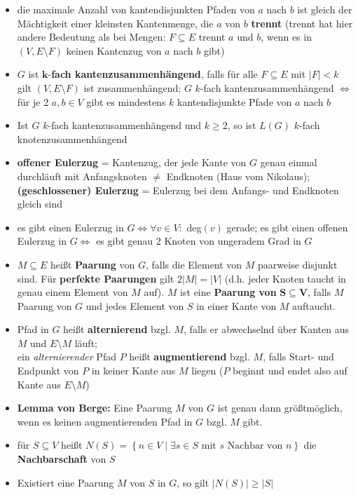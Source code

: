 \documentclass[10pt,a4paper]{article}
\begin{document}
\begin{itemize}
\item die maximale Anzahl von kantendisjunkten Pfaden von $a$ nach $b$ ist gleich der Mächtigkeit einer kleinsten Kantenmenge, die $a$ von $b$ \textbf{trennt} (trennt hat hier andere Bedeutung als bei Mengen: $F\subseteq E$ trennt $a$ und $b$, wenn es in $(V, E\setminus F)$ keinen Kantenzug von $a$ nach $b$ gibt)
\item $G$ ist $\boldsymbol{k}$-\textbf{fach kantenzusammenhängend}, falls für alle $F \subseteq E$ mit $\vert F \vert <k$ gilt $(V,E\setminus F)$ ist zusammenhängend;
$G$ $k$-fach kantenzusammenhängend $\Leftrightarrow$ für je 2 $a,b\in V$ gibt es mindestens $k$ kantendisjunkte Pfade von $a$ nach $b$
\item Ist $G$ $k$-fach kantenzusammenhängend und $k\geq 2$, so ist $L(G)$ $k$-fach knotenzusammenhängend
\item \textbf{offener Eulerzug} = Kantenzug, der jede Kante von $G$ genau einmal durchläuft mit Anfangsknoten $\neq$ Endknoten (Haus vom Nikolaus); \textbf{(geschlossener) Eulerzug} = Eulerzug bei dem Anfangs- und Endknoten gleich sind 
\item es gibt einen Eulerzug in $G\Leftrightarrow \forall v\in V :$ deg$(v)$ gerade; es gibt einen offenen Eulerzug in $G\Leftrightarrow$ es gibt genau 2 Knoten von ungeradem Grad in $G$
\item $M\subseteq E$ heißt \textbf{Paarung} von $G$, falls die Element von $M$ paarweise disjunkt sind. Für \textbf{perfekte Paarungen} gilt $2\vert M\vert=\vert V\vert$ (d.h. jeder Knoten taucht in genau einem Element von $M$ auf). $M$ ist eine \textbf{Paarung von} $\boldsymbol{S\subseteq V}$, falls $M$ Paarung von $G$ und jedes Element von $S$ in einer Kante von $M$ auftaucht.
\item Pfad in $G$ heißt \textbf{alternierend} bzgl. $M$, falls er abwechselnd über Kanten aus $M$ und $E\setminus M$ läuft;\\ ein \textit{alternierender} Pfad $P$ heißt \textbf{augmentierend} bzgl. $M$, falls Start- und Endpunkt von $P$ in keiner Kante aus $M$ liegen ($P$ beginnt und endet also auf Kante aus $E\setminus M$)
\item \textbf{Lemma von Berge:} Eine Paarung $M$ von $G$ ist genau dann größtmöglich, wenn es keinen augmentierenden Pfad in $G$ bzgl. $M$ gibt.
\item für $S\subseteq V$ heißt $N(S)=\left\lbrace n\in V\mid \exists s\in S  \text{ mit } s \text{ Nachbar von }n\right\rbrace$ die \textbf{Nachbarschaft} von $S$
\item Existiert eine Paarung $M$ von $S$ in $G$, so gilt $\vert N(S)\vert \geq \vert S \vert$

\end{itemize}
\end{document}
